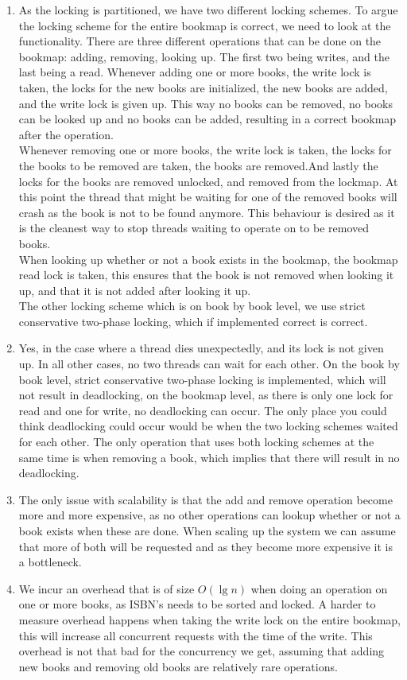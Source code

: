 \documentclass[a4paper]{article}
\begin{document}
\begin{enumerate}
  \item As the locking is partitioned, we have two different locking schemes. To argue the locking scheme for the entire bookmap is correct, we need to look at the functionality. There are three different operations that can be done on the bookmap: adding, removing, looking up. The first two being writes, and the last being a read. Whenever adding one or more books, the write lock is taken, the locks for the new books are initialized, the new books are added, and the write lock is given up. This way no books can be removed, no books can be looked up and no books can be added, resulting in a correct bookmap after the operation.\\
Whenever removing one or more books, the write lock is taken, the locks for the books to be removed are taken, the books are removed.And lastly the locks for the books are removed unlocked, and removed from the lockmap. At this point the thread that might be waiting for one of the removed books will crash as the book is not to be found anymore. This behaviour is desired as it is the cleanest way to stop threads waiting to operate on to be removed books.\\
When looking up whether or not a book exists in the bookmap, the bookmap read lock is taken, this ensures that the book is not removed when looking it up, and that it is not added after looking it up.\\
The other locking scheme which is on book by book level, we use strict conservative two-phase locking, which if implemented correct is correct.
  \item Yes, in the case where a thread dies unexpectedly, and its lock is not given up. In all other cases, no two threads can wait for each other. On the book by book level, strict conservative two-phase locking is implemented, which will not result in deadlocking, on the bookmap level, as there is only one lock for read and one for write, no deadlocking can occur. The only place you could think deadlocking could occur would be when the two locking schemes waited for each other. The only operation that uses both locking schemes at the same time is when removing a book, which implies that there will result in no deadlocking.
  \item The only issue with scalability is that the add and remove operation become more and more expensive, as no other operations can lookup whether or not a book exists when these are done. When scaling up the system we can assume that more of both will be requested and as they become more expensive it is a bottleneck.
  \item We incur an overhead that is of size $O(\lg{n})$ when doing an operation on one or more books, as ISBN's needs to be sorted and locked. A harder to measure overhead happens when taking the write lock on the entire bookmap, this will increase all concurrent requests with the time of the write. This overhead is not that bad for the concurrency we get, assuming that adding new books and removing old books are relatively rare operations.
\end{enumerate}
\end{document}
